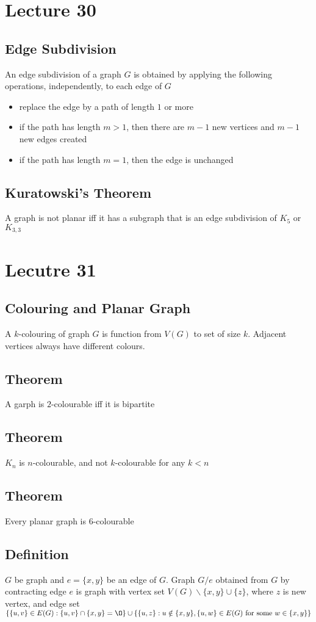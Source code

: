 \documentclass[11pt]{article}
\begin{document}
\section{Lecture 30}
\subsection{Edge Subdivision}
An edge subdivision of a graph $G$ is obtained by applying the following operations, independently, to each edge of $G$
\begin{itemize}
  \item replace the edge by a path of length $1$ or more 
  \item if the path has length $m>1$, then there are $m-1$ new vertices and $m-1$ new edges created
  \item if the path has length $m=1$, then the edge is unchanged
\end{itemize}
\subsection{Kuratowski's Theorem}
A graph is not planar iff it has a subgraph that is an edge subdivision of $K_5$ or $K_{3,3}$


\section{Lecutre 31}
\subsection{Colouring and Planar Graph}
A $k$-colouring of graph $G$ is function from $V(G)$ to set of size $k$. Adjacent vertices always have different colours. 
\subsection*{Theorem}
A garph is $2$-colourable iff it is bipartite
\subsection*{Theorem}
$K_n$ is $n$-colourable, and not $k$-colourable for any $k<n$ 
\subsection*{Theorem}
Every planar graph is $6$-colourable
\subsection*{Definition}
$G$ be graph and $e=\{x,y\}$ be an edge of $G$. Graph $G/e$ obtained from $G$ by contracting edge 
$e$ is graph with vertex set $V(G)\backslash\{x,y\}\cup\{z\}$, where $z$ is new vertex, and edge set 
$\{\{u,v\}\in E(G): \{u,v\}\cap\{x,y\} = \O\}\cup\{\{u,z\}:u\notin\{x,y\},\{u,w\}\in E(G) \text{ for some $w\in\{x,y\}$}\}$
\end{document}
